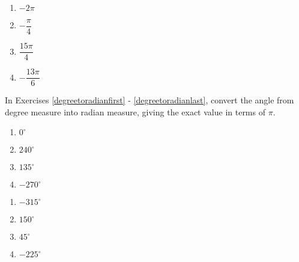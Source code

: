 \begin{multicols}{4} 

\begin{enumerate}

\setcounter{enumi}{\value{HW}}

\item  $-2\pi$ 
\item $-\dfrac{\pi}{4}$ 
\item $\dfrac{15\pi}{4}$
\item $-\dfrac{13\pi}{6}$ \label{orientedanglelast}

\setcounter{HW}{\value{enumi}}

\end{enumerate}

\end{multicols}

In Exercises \ref{degreetoradianfirst} - \ref{degreetoradianlast}, convert the angle from degree measure into radian measure, giving the exact value in terms of $\pi$.

\begin{multicols}{4} 

\begin{enumerate}

\setcounter{enumi}{\value{HW}}

\item $0^{\circ}$ \label{degreetoradianfirst}
\item $240^{\circ}$
\item $135^{\circ}$
\item $-270^{\circ}$

\setcounter{HW}{\value{enumi}}

\end{enumerate}

\end{multicols}

\begin{multicols}{4} 

\begin{enumerate}

\setcounter{enumi}{\value{HW}}

\item $-315^{\circ}$
\item $150^{\circ}$
\item $45^{\circ}$
\item $-225^{\circ}$ \label{degreetoradianlast}

\setcounter{HW}{\value{enumi}}

\end{enumerate}

\end{multicols}

